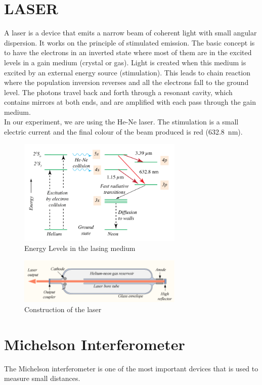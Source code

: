\section{LASER}
A laser is a device that emits a narrow beam of coherent light with small angular dispersion. It works on the principle of stimulated emission. The basic concept is to have the electrons in an inverted state where most of them are in the excited levels in a gain medium (crystal or gas). Light is created when this medium is excited by an external energy source (stimulation). This leads to chain reaction where the population inversion reverses and all the electrons fall to the ground level. The photons travel back and forth through a resonant cavity, which contains mirrors at both ends, and are amplified with each pass through the gain medium.\\
In our experiment, we are using the He-Ne laser. The stimulation is a small electric current and the final colour of the beam produced is red (\SI{632.8}{\nano \meter}).
\begin{figure}[H]
	\centering
	\includegraphics[width=0.7\textwidth]{hene.png}
	\caption{Energy Levels in the lasing medium}
	\label{fig:flow around cylinder}
	
\end{figure}
\begin{figure}[H]
	\centering
	\includegraphics[width=0.7\textwidth]{hene1.png}
	\caption{Construction of the laser}
	\label{fig:flow around cylinder}
	
\end{figure}
\section{Michelson Interferometer}
The Michelson interferometer is one of the most important devices that is used to measure small distances.

